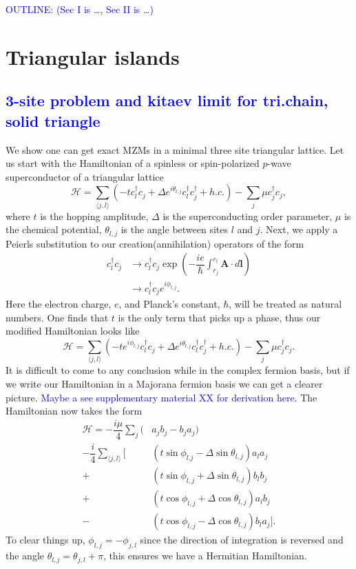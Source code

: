 \documentclass[aps,prb,showpacs,amsmath,amssymb,superscriptaddress]{revtex4-2}
\newcommand{\Blue}[1]{\textcolor{blue}{#1}}
\renewcommand{\vec}[1]{\mathbf{#1}}
\newcommand{\ham}{\mathcal{H}}
\newcommand{\cc}{c^{\dagger}}
\newcommand{\de}{\Delta}
\begin{document}
\Blue{OUTLINE: (Sec I is \dots, Sec II is \dots)}
\section{Triangular islands}

\subsection{\Blue{3-site problem and kitaev limit for tri.chain, solid triangle}}
We show one can get exact MZMs in a minimal three site triangular lattice.
Let us start with the Hamiltonian of a spinless or spin-polarized $p$-wave superconductor of a triangular lattice
\begin{equation}
  \ham = \sum_{\langle j, l \rangle} (-t\cc_{l} c_j + \de e^{i\theta_{l,j}} \cc_{l}\cc_j + h.c.) - \sum_{j} \mu \cc_j c_j,
\end{equation}
where $t$ is the hopping amplitude, $\de$ is the superconducting order parameter, $\mu$ is the chemical potential, $\theta_{l,j}$ is the angle between sites $l$ and $j$.
Next, we apply a Peierls substitution to our creation(annihilation) operators of the form
\begin{align}
  \cc_{l} c_j &\rightarrow \cc_{l} c_j \exp \left(-\dfrac{i e}{\hbar} \int_{r_j}^{r_{l}} \vec{A} \cdot d\vec{l} \right) \\ \nonumber
  &\rightarrow \cc_{l} c_j e^{i \phi_{l,j}}.
\end{align}
Here the electron charge, $e$, and Planck's constant, $\hbar$, will be treated as natural numbers.
One finds that $t$ is the only term that picks up a phase, thus our modified Hamiltonian looks like
\begin{equation} \label{eq: Peierls Hamiltonian}
  \ham = \sum_{\langle j,l \rangle} (-t e^{i\phi_{l,j}} \cc_{l} c_j + \de e^{i\theta_{l,j}} \cc_{l}\cc_j + h.c.) - \sum_j \mu \cc_j c_j.
\end{equation}
It is difficult to come to any conclusion while in the complex fermion basis, but if we write our Hamiltonian in a Majorana fermion basis we can get a clearer picture.
\Blue{Maybe a see supplementary material XX for derivation here.}
The Hamiltonian now takes the form
\begin{align}
  \ham = -\dfrac{i\mu}{4} \sum_j (& a_j b_j - b_j a_j) \nonumber \\
  -\dfrac{i}{4} \sum_{\langle j,l \rangle} [&(t\sin\phi_{l.j}-\de\sin\theta_{l,j}) a_l a_j \nonumber \\
  +&(t\sin\phi_{l,j}+\de\sin\theta_{l,j}) b_l b_j \nonumber \\
  +&(t\cos\phi_{l,j}+\de\cos\theta_{l,j}) a_l b_j \nonumber \\
  -&(t\cos\phi_{l,j}-\de\cos\theta_{l,j}) b_l a_j].
\end{align}
To clear things up, $\phi_{l,j} = -\phi_{j,l}$ since the direction of integration is reversed and the angle $\theta_{l,j} = \theta_{j,l} + \pi$, this ensures we have a Hermitian Hamiltonian.
\end{document}
